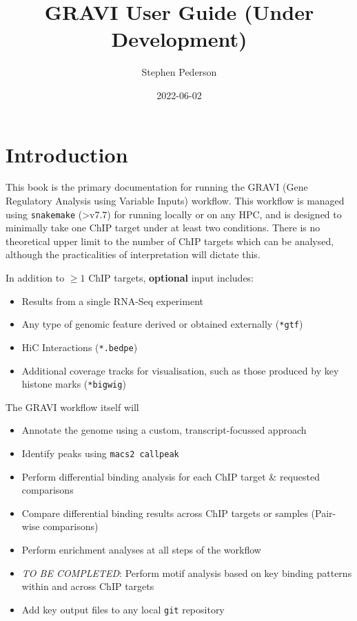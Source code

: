 \documentclass[
]{book}
\title{GRAVI User Guide (Under Development)}
\author{Stephen Pederson}
\date{2022-06-02}
\providecommand{\tightlist}{%
  \setlength{\itemsep}{0pt}\setlength{\parskip}{0pt}}
\begin{document}
\maketitle

{
\setcounter{tocdepth}{1}
\tableofcontents
}
\hypertarget{introduction}{%
\chapter{Introduction}\label{introduction}}

This book is the primary documentation for running the GRAVI (Gene Regulatory Analysis using Variable Inputs) workflow.
This workflow is managed using \texttt{snakemake} (\textgreater v7.7) for running locally or on any HPC, and is designed to minimally take one ChIP target under at least two conditions.
There is no theoretical upper limit to the number of ChIP targets which can be analysed, although the practicalities of interpretation will dictate this.

In addition to \(\geq 1\) ChIP targets, \textbf{optional} input includes:

\begin{itemize}
\tightlist
\item
  Results from a single RNA-Seq experiment
\item
  Any type of genomic feature derived or obtained externally (\texttt{*gtf})
\item
  HiC Interactions (\texttt{*.bedpe})
\item
  Additional coverage tracks for visualisation, such as those produced by key histone marks (\texttt{*bigwig})
\end{itemize}

The GRAVI workflow itself will

\begin{itemize}
\tightlist
\item
  Annotate the genome using a custom, transcript-focussed approach
\item
  Identify peaks using \texttt{macs2\ callpeak}
\item
  Perform differential binding analysis for each ChIP target \& requested comparisons
\item
  Compare differential binding results across ChIP targets or samples (Pair-wise comparisons)
\item
  Perform enrichment analyses at all steps of the workflow
\item
  \emph{TO BE COMPLETED}: Perform motif analysis based on key binding patterns within and across ChIP targets
\item
  Add key output files to any local \texttt{git} repository
\end{itemize}
\end{document}
